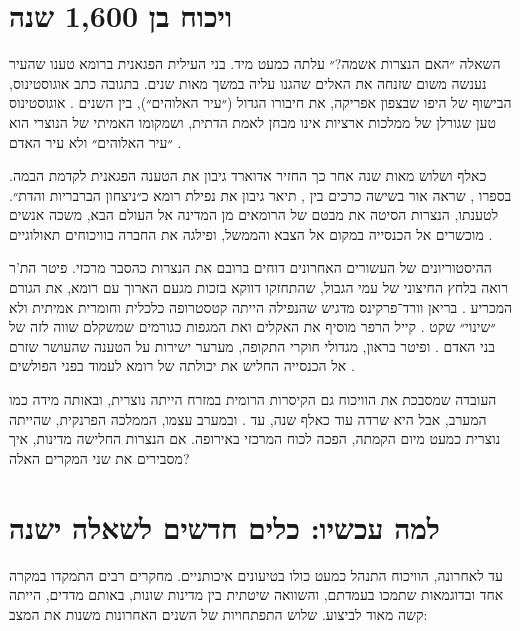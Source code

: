 \section{ויכוח בן 1,600 שנה}
\label{sec:intro-debate}

השאלה ״האם הנצרות אשמה?״ עלתה כמעט מיד. בני העילית הפגאנית ברומא טענו שהעיר נענשה משום שזנחה את האלים שהגנו עליה במשך מאות שנים. בתגובה כתב אוגוסטינוס, הבישוף של היפו שבצפון אפריקה, את חיבורו הגדול  (״עיר האלוהים״), בין השנים . אוגוסטינוס טען שגורלן של ממלכות ארציות אינו מבחן לאמת הדתית, ושמקומו האמיתי של הנוצרי הוא ״עיר האלוהים״ ולא עיר האדם \cite{augustine_citygod}.

כאלף ושלוש מאות שנה אחר כך החזיר אדוארד גיבון את הטענה הפגאנית לקדמת הבמה. בספרו , שראה אור בשישה כרכים בין , תיאר גיבון את נפילת רומא כ״ניצחון הברבריות והדת״. לטענתו, הנצרות הסיטה את מבטם של הרומאים מן המדינה אל העולם הבא, משכה אנשים מוכשרים אל הכנסייה במקום אל הצבא והממשל, ופילגה את החברה בוויכוחים תאולוגיים \cite{gibbon_decline}.

ההיסטוריונים של העשורים האחרונים דוחים ברובם את הנצרות כהסבר מרכזי. פיטר הת'ר רואה בלחץ החיצוני של עמי הגבול, שהתחזקו דווקא בזכות מגעם הארוך עם רומא, את הגורם המכריע \cite{heather2005fall}. בריאן וורד־פרקינס מדגיש שהנפילה הייתה קטסטרופה כלכלית וחומרית אמיתית ולא ״שינוי״ שקט \cite{wardperkins2005fall}. קייל הרפר מוסיף את האקלים ואת המגפות כגורמים שמשקלם שווה לזה של בני האדם \cite{harper2017fate}. ופיטר בראון, מגדולי חוקרי התקופה, מערער ישירות על הטענה שהעושר שזרם אל הכנסייה החליש את יכולתה של רומא לעמוד בפני הפולשים \cite{brown2012needle}.

\begin{keybox}{העובדה שמסבכת את הוויכוח}
גם הקיסרות הרומית במזרח הייתה נוצרית, ובאותה מידה כמו המערב, אבל היא שרדה עוד כאלף שנה, עד . ובמערב עצמו, הממלכה הפרנקית, שהייתה נוצרית כמעט מיום הקמתה, הפכה לכוח המרכזי באירופה. אם הנצרות החלישה מדינות, איך מסבירים את שני המקרים האלה?
\end{keybox}

\section{למה עכשיו: כלים חדשים לשאלה ישנה}
\label{sec:intro-why-now}

עד לאחרונה, הוויכוח התנהל כמעט כולו בטיעונים איכותניים. מחקרים רבים התמקדו במקרה אחד ובדוגמאות שתמכו בעמדתם, והשוואה שיטתית בין מדינות שונות, באותם מדדים, הייתה קשה מאוד לביצוע. שלוש התפתחויות של השנים האחרונות משנות את המצב:

